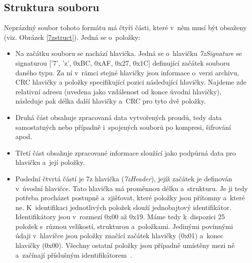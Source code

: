 \subsection{Struktura souboru}
\label{ssec:7z_struct}
Neprázdný soubor tohoto formátu má čtyři části, které v~něm musí být obsaženy (viz. Obrázek
\ref{7zstruct}). Jedná se o~položky: 
\begin{itemize}
    \item Na začátku souboru se nachází hlavička. Jedná se o~hlavičku {\it 7zSignature} se
	signaturou ['7', 'z', 0xBC, 0xAF, 0x27, 0x1C] definující začátek souboru daného typu.
	Za ní v~rámci stejné hlavičky jsou informace o~verzi archivu, CRC hlavičky a položky
	specifikující pozici následující hlavičky. Najdeme zde relativní adresu (uvedena jako
	vzdálenost od konce úvodní hlavičky), následuje pak délka další hlavičky a~CRC pro tyto dvě
	položky.
    \item Druhá část obsahuje zpracovaná data vytvořených proudů, tedy data samostatných nebo
	případně i~spojených souborů po kompresi, šifrování apod.
    \item Třetí část obsahuje zpracované informace sloužící jako podpůrná data pro hlavičku a~její
	položky.
    \item Poslední čtvrtá částí je 7z hlavička ({\it 7zHeader}), jejíž začátek je definován
	v~úvodní hlavičce. Tato hlavička má proměnnou délku a~strukturu. Je ji tedy potřeba
	procházet postupně a~zjišťovat, které položky jsou přítomny a~které ne. K~identifikaci
	jednotlivých položek slouží jednobajtový identifikátor. Identifikátory jsou v~rozmezí 0x00
	až 0x19. Máme tedy k~dispozici 25 položek s~různou velikostí, strukturou a~položkami.
	Jedinými povinnými údaji v~hlavičce jsou položky značící začátek hlavičky (0x01) a~konec
	hlavičky (0x00). Všechny ostatní položky jsou případně umístěny mezi ně a~začínají
	příslušným identifikátorem~\cite{Pavlov:2010}. 
\end{itemize}
